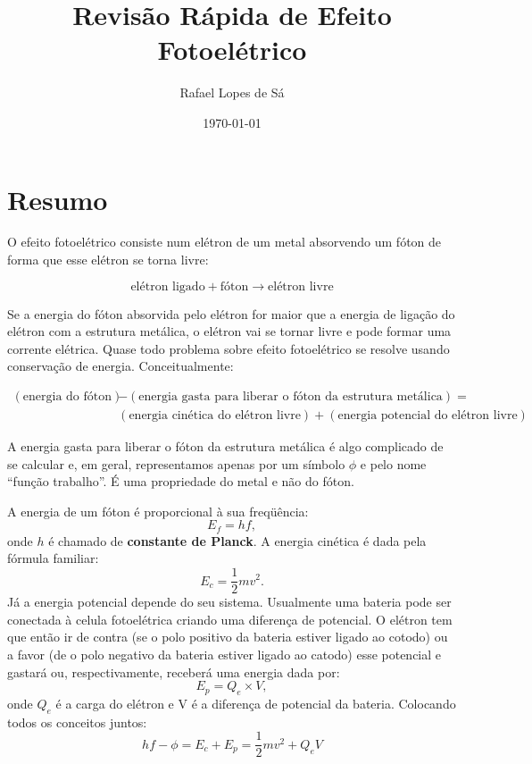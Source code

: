 \documentclass{article}
\title{Revis\~ao R\'apida de Efeito Fotoel\'etrico}
\author{Rafael Lopes de S\'a}
\date{\today}
\begin{document}
\maketitle

\section{Resumo}

O efeito fotoel\'etrico consiste num el\'etron de um metal absorvendo um f\'oton de forma que esse el\'etron se torna livre:

\begin{equation}
\text{el\'etron ligado} + \text{f\'oton} \rightarrow \text{el\'etron livre}
\end{equation}



Se a energia do f\'oton absorvida pelo el\'etron for maior que a energia de liga\c c\~ao do el\'etron com a estrutura met\'alica, o el\'etron vai se tornar livre e pode formar uma corrente el\'etrica. Quase todo problema sobre efeito fotoel\'etrico se resolve usando conserva\c c\~ao de energia. Conceitualmente:

\begin{equation}
\begin{split}
(\text{energia do f\'oton}) &- (\text{energia gasta para liberar o f\'oton da estrutura met\'alica}) = \\
&(\text{energia cin\'etica do el\'etron livre}) + (\text{energia potencial do el\'etron livre})
\end{split}
\end{equation}

A energia gasta para liberar o f\'oton da estrutura met\'alica \'e algo complicado de se calcular e, em geral, representamos apenas por um s\'imbolo $\phi$ e pelo nome ``fun\c c\~ao trabalho''. \'E uma propriedade do metal e n\~ao do f\'oton.

A energia de um f\'oton \'e proporcional \`a sua freq\"u\^encia:
\begin{equation}
E_f = hf,
\end{equation}
onde $h$ \'e chamado de \textbf{constante de Planck}. A energia cin\'etica \'e dada pela f\'ormula familiar:
\begin{equation}
E_c = \frac{1}{2}mv^2.
\end{equation}
J\'a a energia potencial depende do seu sistema. Usualmente uma bateria pode ser conectada \`a celula fotoel\'etrica criando uma diferen\c ca de potencial. O el\'etron tem que ent\~ao ir de contra (se o polo positivo da bateria estiver ligado ao cotodo) ou a favor (de o polo negativo da bateria estiver ligado ao catodo) esse potencial e gastar\'a ou, respectivamente, receber\'a uma energia dada por:
\begin{equation}
E_p = Q_e\times V,
\end{equation}
onde $Q_e$ \'e a carga do el\'etron e V \'e a diferen\c ca de potencial da bateria. Colocando todos os conceitos juntos:
\begin{equation}
hf - \phi = E_c + E_p = \frac{1}{2}mv^2 + Q_eV
\end{equation}
\end{document}
